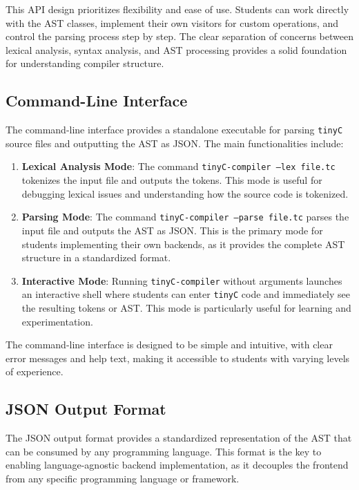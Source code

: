 This API design prioritizes flexibility and ease of use. Students can work directly with the AST classes, implement their own visitors for custom operations, and control the parsing process step by step. The clear separation of concerns between lexical analysis, syntax analysis, and AST processing provides a solid foundation for understanding compiler structure.


\subsection{Command-Line Interface}

The command-line interface provides a standalone executable for parsing \texttt{tinyC} source files and outputting the AST as JSON. The main functionalities include:

\begin{enumerate}
    \item \textbf{Lexical Analysis Mode}: The command \texttt{tinyC-compiler --lex file.tc} tokenizes the input file and outputs the tokens. This mode is useful for debugging lexical issues and understanding how the source code is tokenized.

    \item \textbf{Parsing Mode}: The command \texttt{tinyC-compiler --parse file.tc} parses the input file and outputs the AST as JSON. This is the primary mode for students implementing their own backends, as it provides the complete AST structure in a standardized format.

    \item \textbf{Interactive Mode}: Running \texttt{tinyC-compiler} without arguments launches an interactive shell where students can enter \texttt{tinyC} code and immediately see the resulting tokens or AST. This mode is particularly useful for learning and experimentation.
\end{enumerate}

The command-line interface is designed to be simple and intuitive, with clear error messages and help text, making it accessible to students with varying levels of experience.

\subsection{JSON Output Format}
The JSON output format provides a standardized representation of the AST that can be consumed by any programming language. This format is the key to enabling language-agnostic backend implementation, as it decouples the frontend from any specific programming language or framework.

